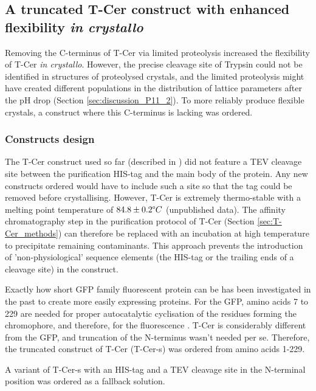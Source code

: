 \subsection{A truncated T-Cer construct with enhanced flexibility \textit{in crystallo}}\label{sec:short}

Removing the C-terminus of T-Cer via limited proteolysis increased the flexibility of T-Cer \textit{in crystallo}. However, the precise cleavage site of Trypsin could not be identified in structures of proteolysed crystals, and the limited proteolysis might have created different populations in the distribution of lattice parameters after the pH drop (Section \ref{sec:discussion_P11_2}). To more reliably produce flexible crystals, a construct where this C-terminus is lacking was ordered. 

\subsubsection{Constructs design}
The T-Cer construct used so far (described in \cite{aumonierTimeresolvedMonochromaticSynchrotron2019}) did not feature a TEV cleavage site between the purification HIS-tag and the main body of the protein. Any new constructs ordered would have to include such a site so that the tag could be removed before crystallising. However, T-Cer is extremely thermo-stable with a melting point temperature of \( 84.8 \pm 0.2 \degree C \) (unpublished data). The affinity chromatography step in the purification protocol of T-Cer (Section \ref{sec:T-Cer_methods}) can therefore be replaced with an incubation at high temperature to precipitate remaining contaminants. This approach prevents the introduction of 'non-physiological' sequence elements (the HIS-tag or the trailing ends of a cleavage site) in the construct. 

Exactly how short GFP family fluorescent protein can be has been investigated in the past to create more easily expressing proteins. For the GFP, amino acids 7 to 229 are needed for proper autocatalytic cyclisation of the residues forming the chromophore, and therefore, for the fluorescence \parencite{liDeletionsAequoreaVictoria1997}. T-Cer is considerably different from the GFP, and truncation of the N-terminus wasn't needed per se. Therefore, the truncated construct of T-Cer (T-Cer-s) was ordered from amino acids 1-229.

A variant of T-Cer-s with an HIS-tag and a TEV cleavage site in the N-terminal position was ordered as a fallback solution.

